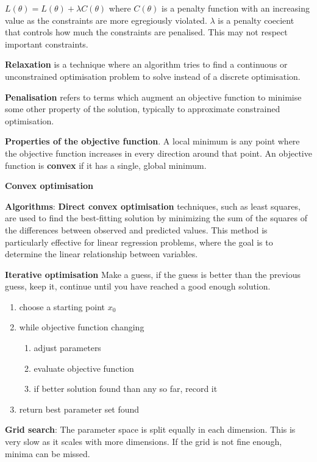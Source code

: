 \documentclass{article}
\begin{document}
\noindent $ L(\theta) = L(\theta) + \lambda C(\theta) $ where $C(\theta)$ is a penalty function with an increasing value as the
constraints are more egregiously violated. $\lambda$ is a penalty coecient that controls how much the constraints are penalised.
This may not respect important constraints.

\noindent \textbf{Relaxation} is a technique where an algorithm tries to find a continuous or unconstrained
optimisation problem to solve instead of a discrete optimisation.

\noindent \textbf{Penalisation} refers to terms which augment an objective function to minimise some other property of
the solution, typically to approximate constrained optimisation.

\noindent \textbf{Properties of the objective function}. A local minimum is any point where the objective function
increases in every direction around that point. An objective function is \textbf{convex} if it has a single, global minimum.

\noindent \textbf{Convex optimisation}

\noindent \textbf{Algorithms}:
\textbf{Direct convex optimisation} techniques, such as least squares,
are used to find the best-fitting solution by minimizing the sum of the squares of the differences
between observed and predicted values. This method is particularly effective for linear regression
problems, where the goal is to determine the linear relationship between variables.

\noindent \textbf{Iterative optimisation}
Make a guess, if the guess is better than the previous guess, keep it, continue until you have reached a good enough solution.
\begin{enumerate}
    \item choose a starting point $x_0$
    \item while objective function changing
    \begin{enumerate}
        \item adjust parameters
        \item evaluate objective function
        \item if better solution found than any so far, record it
    \end{enumerate}
    \item return best parameter set found
\end{enumerate}

\noindent \textbf{Grid search}: The parameter space is split equally in each dimension.
This is very slow as it scales with more dimensions.
If the grid is not fine enough, minima can be missed.
\end{document}

